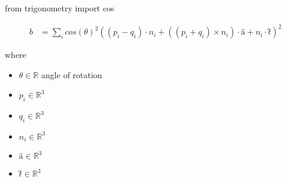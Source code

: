 \documentclass[12pt]{article}
\begin{document}
from trigonometry import cos

\begin{align*}
\textit{b} & = \sum_\textit{i} cos\left( \textit{θ} \right)^{2}\left( \left( \textit{p}_{ \textit{i} } - \textit{q}_{ \textit{i} } \right) \cdot \textit{n}_{ \textit{i} } + \left( \left( \textit{p}_{ \textit{i} } + \textit{q}_{ \textit{i} } \right) × \textit{n}_{ \textit{i} } \right) \cdot \textit{ã} + \textit{n}_{ \textit{i} } \cdot \textit{t̃} \right)^{2}
\end{align*}

where
\begin{itemize}
\item $\textit{θ} \in \mathbb{{R}}$ angle of rotation
\item $\textit{p}_{\textit{i}} \in \mathbb{R}^{ 3}$
\item $\textit{q}_{\textit{i}} \in \mathbb{R}^{ 3}$
\item $\textit{n}_{\textit{i}} \in \mathbb{R}^{ 3}$
\item $\textit{ã} \in \mathbb{R}^{ 3}$
\item $\textit{t̃} \in \mathbb{R}^{ 3}$
\end{itemize}
\end{document}
